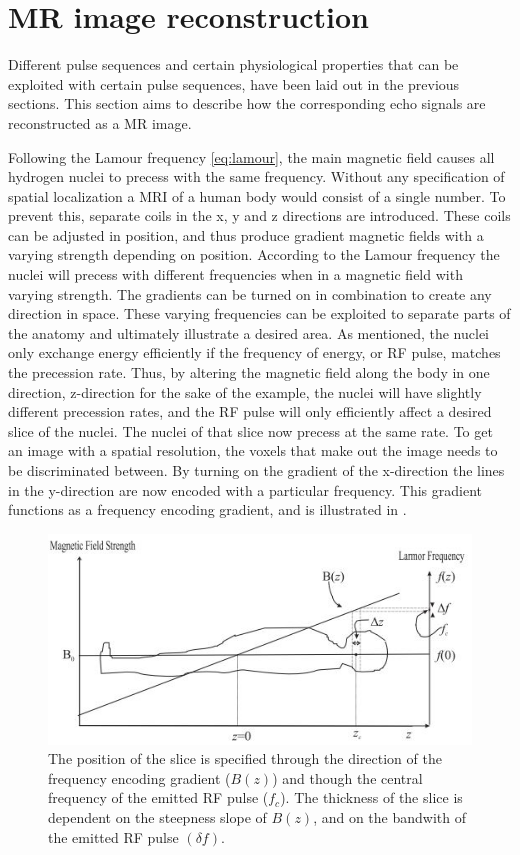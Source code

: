 \section{MR image reconstruction}

Different pulse sequences and certain physiological properties that can be exploited with certain pulse sequences, have been laid out in the previous sections. This section aims to describe how the corresponding echo signals are reconstructed as a MR image.

Following the Lamour frequency \eqref{eq:lamour}, the main magnetic field causes all hydrogen nuclei to precess with the same frequency. Without any specification of spatial localization a MRI of a human body would consist of a single number. To prevent this, separate coils in the x, y and z directions are introduced. These coils can be adjusted in position, and thus produce gradient magnetic fields with a varying strength depending on position. According to the Lamour frequency the nuclei will precess with different frequencies when in a magnetic field with varying strength. The gradients can be turned on in combination to create any direction in space. These varying frequencies can be exploited to separate parts of the anatomy and ultimately illustrate a desired area. As mentioned, the nuclei only exchange energy efficiently if the frequency of energy, or RF pulse, matches the precession rate. Thus, by altering the magnetic field along the body in one direction, z-direction for the sake of the example, the nuclei will have slightly different precession rates, and the RF pulse will only efficiently affect a desired slice of the nuclei.
The nuclei of that slice now precess at the same rate. To get an image with a spatial resolution, the voxels that make out the image needs to be discriminated between. By turning on the gradient of the x-direction the lines in the y-direction are now encoded with a particular frequency. This gradient functions as a frequency encoding gradient, and is illustrated in . \cite{Bharath2008} \\
 \begin{figure}[H]                 
	\includegraphics[width=.7\textwidth]{figures/aBackground/gradient}  
	\caption{The position of the slice is specified through the direction of the frequency encoding gradient ($B(z)$) and though the central frequency of the emitted RF pulse ($f_c$). The thickness of the slice is dependent on the steepness slope of $B(z)$, and on the bandwith of the emitted RF pulse $(\delta f)$. \cite{Bharath2008}}
	\label{fig:back:gradient} 
\end{figure}
